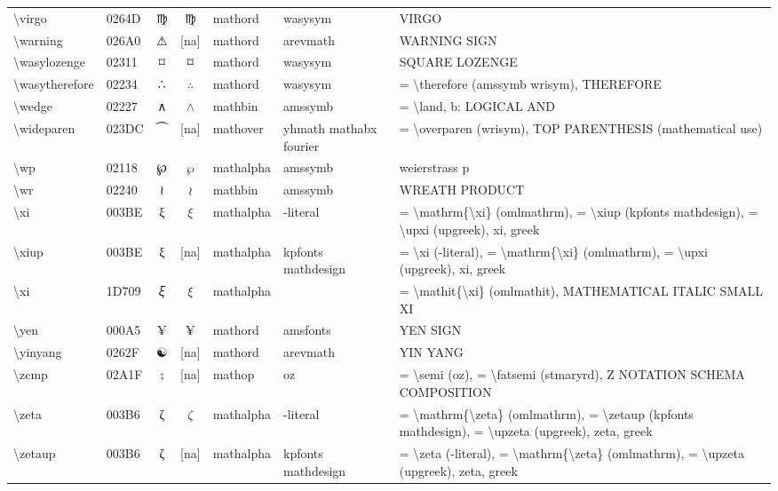 \documentclass[a4paper,landscape]{article}
\begin{document}
\begin{longtable}{llcclll}
\textbackslash{}virgo & 0264D & \textsf ♍ & $\virgo$ & mathord & wasysym & VIRGO \\
\textbackslash{}warning & 026A0 & ⚠ & [na] & mathord & arevmath & WARNING SIGN \\
\textbackslash{}wasylozenge & 02311 & ⌑ & $\wasylozenge$ & mathord & wasysym & SQUARE LOZENGE \\
\textbackslash{}wasytherefore & 02234 & ∴ & $\wasytherefore$ & mathord & wasysym & = \textbackslash{}therefore (amssymb wrisym),  THEREFORE \\
\textbackslash{}wedge & 02227 & ∧ & $\wedge$ & mathbin & amssymb & = \textbackslash{}land, b: LOGICAL AND \\
\textbackslash{}wideparen & 023DC & ⏜ & [na] & mathover & yhmath mathabx fourier & = \textbackslash{}overparen (wrisym),  TOP PARENTHESIS (mathematical use) \\
\textbackslash{}wp & 02118 & ℘ & $\wp$ & mathalpha & amssymb & weierstrass p \\
\textbackslash{}wr & 02240 & ≀ & $\wr$ & mathbin & amssymb & WREATH PRODUCT \\
\textbackslash{}xi & 003BE & ξ & $\xi$ & mathalpha & -literal & = \textbackslash{}mathrm\{\textbackslash{}xi\} (omlmathrm), = \textbackslash{}xiup (kpfonts mathdesign), = \textbackslash{}upxi (upgreek), xi, greek \\
\textbackslash{}xiup & 003BE & ξ & [na] & mathalpha & kpfonts mathdesign & = \textbackslash{}xi (-literal), = \textbackslash{}mathrm\{\textbackslash{}xi\} (omlmathrm),  = \textbackslash{}upxi (upgreek),  xi,  greek \\
\textbackslash{}xi & 1D709 & 𝜉 & $\xi$ & mathalpha &  & = \textbackslash{}mathit\{\textbackslash{}xi\} (omlmathit), MATHEMATICAL ITALIC SMALL XI \\
\textbackslash{}yen & 000A5 & ¥ & $\yen$ & mathord & amsfonts & YEN SIGN \\
\textbackslash{}yinyang & 0262F & ☯ & [na] & mathord & arevmath & YIN YANG \\
\textbackslash{}zcmp & 02A1F & ⨟ & [na] & mathop & oz & = \textbackslash{}semi (oz), = \textbackslash{}fatsemi (stmaryrd), Z NOTATION SCHEMA COMPOSITION \\
\textbackslash{}zeta & 003B6 & ζ & $\zeta$ & mathalpha & -literal & = \textbackslash{}mathrm\{\textbackslash{}zeta\} (omlmathrm), = \textbackslash{}zetaup (kpfonts mathdesign), = \textbackslash{}upzeta (upgreek), zeta, greek \\
\textbackslash{}zetaup & 003B6 & ζ & [na] & mathalpha & kpfonts mathdesign & = \textbackslash{}zeta (-literal), = \textbackslash{}mathrm\{\textbackslash{}zeta\} (omlmathrm),  = \textbackslash{}upzeta (upgreek),  zeta,  greek \\

\end{longtable}
\end{document}
